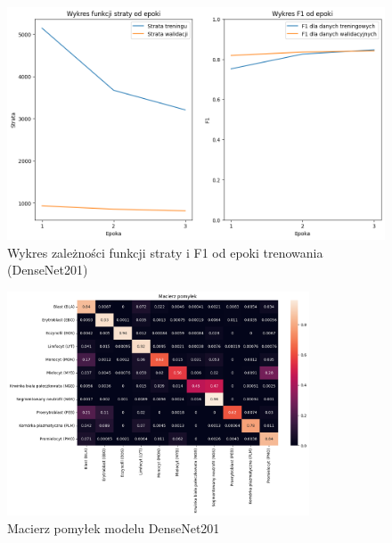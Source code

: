 \begin{figure}
    \centering
    \includegraphics[width=\textwidth]{experiments/densenet201/combined}
    \caption{Wykres zależności funkcji straty i F1 od epoki trenowania (DenseNet201)}
    \label{fig:plot_densenet201}
\end{figure}
\begin{figure}
    \centering
    \includegraphics[width=0.8\textwidth]{experiments/densenet201/confusion_matrix}
    \caption{Macierz pomyłek modelu DenseNet201}
    \label{fig:confusion_densenet201}
\end{figure}

